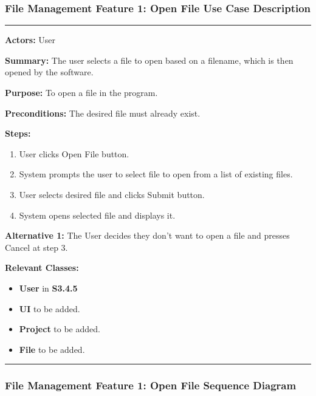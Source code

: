 \documentclass[twoside,letterpaper]{article}
\begin{document}
\newpage

\subsubsection[File Management Feature 1: Open File Use Case Description]{\rmfamily\bfseries\color{black}
	File Management Feature 1: Open File Use Case Description}
\hypertarget{RefHeading22059017292}{}

\vspace{2pt}
\hrule
\vspace{8pt}
\textbf{Actors:} User \newline

\noindent\textbf{Summary:} The user selects a file to open based on a filename, which is then opened by the software. \newline

\noindent\textbf{Purpose:} To open a file in the program. \newline

\noindent\textbf{Preconditions:} The desired file must already exist. \newline

\noindent\textbf{Steps:}
\begin{enumerate}
	\item User clicks Open File button.
	\item System prompts the user to select file to open from a list of existing files.
	\item User selects desired file and clicks Submit button.
	\item System opens selected file and displays it.
\end{enumerate}
\noindent\textbf{Alternative 1:} The User decides they don't want to open a file and presses Cancel at step 3. \newline

\noindent\textbf{Relevant Classes:}
\begin{itemize}
	\item \textbf{User} in \textbf{S3.4.5}
	\item \textbf{UI} to be added.
	\item \textbf{Project} to be added.
	\item \textbf{File} to be added.
\end{itemize}

\hrule

\newpage

\subsubsection[File Management Feature 1: Open File Sequence Diagram]{\rmfamily\bfseries\color{black}
	File Management Feature 1: Open File Sequence Diagram}
\hypertarget{RefHeading22059017292}{}
\end{document}

